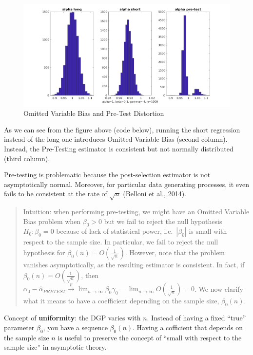 \documentclass[12pt,]{book}
\begin{document}
\begin{figure}
\centering
\includegraphics{figures/Fig_621.png}
\caption{Omitted Variable Bias and Pre-Test Distortion}
\end{figure}

As we can see from the figure above (code below), running the short regression instead of the long one introduces Omitted Variable Bias (second column). Instead, the Pre-Testing estimator is consistent but not normally distributed (third column).

Pre-testing is problematic because the post-selection estimator is not asymptotically normal. Moreover, for particular data generating processes, it even fails to be consistent at the rate of \(\sqrt{n}\) (Belloni et al., 2014).

\begin{quote}
Intuition: when performing pre-testing, we might have an Omitted Variable Bias problem when \(\beta_0>0\) but we fail to reject the null hypothesis \(H_0 : \beta_0 = 0\) because of lack of statistical power, i.e.~\(|\beta_0|\) is small with respect to the sample size. In particular, we fail to reject the null hypothesis for \(\beta_0(n) = O \left( \frac{1}{\sqrt{n}}\right)\). However, note that the problem vanishes asymptotically, as the resulting estimator is consistent. In fact, if \(\beta_0(n) = O \left( \frac{1}{\sqrt{n}}\right)\), then \(\alpha_0 - \hat \alpha_{PRETEST} \overset{p}{\to} \lim_{n \to \infty} \beta_0 \gamma_0 = \lim_{n \to \infty} O \left( \frac{1}{\sqrt{n}} \right) = 0\). We now clarify what it means to have a coefficient depending on the sample size, \(\beta_0(n)\).
\end{quote}

Concept of \textbf{uniformity}: the DGP varies with \(n\). Instead of having a fixed ``true'' parameter \(\beta_0\), you have a sequence \(\beta_0(n)\).
Having a cofficient that depends on the sample size \(n\) is useful to preserve the concept of ``small with respect to the sample size'' in asymptotic theory.
\end{document}
